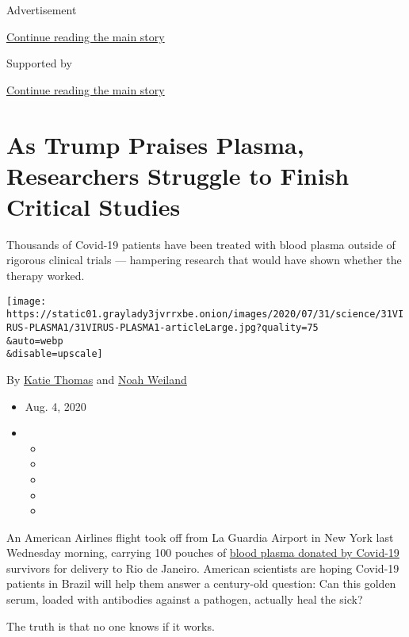 Advertisement

\protect\hyperlink{after-top}{Continue reading the main story}

Supported by

\protect\hyperlink{after-sponsor}{Continue reading the main story}

\hypertarget{as-trump-praises-plasma-researchers-struggle-to-finish-critical-studies}{%
\section{As Trump Praises Plasma, Researchers Struggle to Finish
Critical
Studies}\label{as-trump-praises-plasma-researchers-struggle-to-finish-critical-studies}}

Thousands of Covid-19 patients have been treated with blood plasma
outside of rigorous clinical trials --- hampering research that would
have shown whether the therapy worked.

\texttt{[image: https://static01.graylady3jvrrxbe.onion/images/2020/07/31/science/31VIRUS-PLASMA1/31VIRUS-PLASMA1-articleLarge.jpg?quality=75\\\&auto=webp\\\&disable=upscale]}

By \href{https://www.nytimes3xbfgragh.onion/by/katie-thomas}{Katie
Thomas} and
\href{https://www.nytimes3xbfgragh.onion/by/noah-weiland}{Noah Weiland}

\begin{itemize}
\item
  Aug. 4, 2020
\item
  \begin{itemize}
  \item
  \item
  \item
  \item
  \item
  \end{itemize}
\end{itemize}

An American Airlines flight took off from La Guardia Airport in New York
last Wednesday morning, carrying 100 pouches of
\href{https://www.nytimes3xbfgragh.onion/2020/08/04/health/trump-plasma.html}{blood
plasma donated by Covid-19} survivors for delivery to Rio de Janeiro.
American scientists are hoping Covid-19 patients in Brazil will help
them answer a century-old question: Can this golden serum, loaded with
antibodies against a pathogen, actually heal the sick?

The truth is that no one knows if it works.

